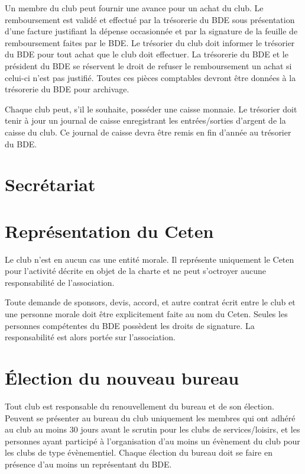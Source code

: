 \documentclass{article}
\begin{document}
\begin{multicols}{2}
{			Un membre du club peut fournir une avance pour un achat du club. Le
			remboursement est validé et effectué par la trésorerie du BDE sous
			présentation d’une facture justifiant la dépense occasionnée et par
			la signature de la feuille de remboursement faites par le BDE\@. Le
			trésorier du club doit informer le trésorier du BDE pour tout achat
			que le club doit effectuer. La trésorerie du BDE et le président du
			BDE se réservent le droit de refuser le remboursement un achat si
			celui-ci n’est pas justifié. Toutes ces pièces comptables devront
			être données à la trésorerie du BDE pour archivage.

			Chaque club peut, s’il le souhaite, posséder une caisse
			monnaie. Le trésorier doit tenir à jour un journal de caisse
			enregistrant les entrées/sorties d’argent de la caisse du
			club. Ce journal de caisse devra être remis en fin d’année au
			trésorier du BDE\@.

		}

		\section{Secrétariat}
\label{sec:secretariat}

		\section{Représentation du Ceten}
\label{sec:representation_du_ceten}

		{\small

			Le club n’est en aucun cas une entité morale. Il représente
			uniquement le Ceten pour l’activité décrite en objet de la charte et
			ne peut s’octroyer aucune responsabilité de l’association.

			Toute demande de sponsors, devis, accord, et autre contrat
			écrit entre le club et une personne morale doit être
			explicitement faite au nom du Ceten. Seules les personnes
			compétentes du BDE possèdent les droits de signature. La
			responsabilité est alors portée sur l’association.

		}

		\section{Élection du nouveau bureau}
\label{sec:election_du_nouveau_bureau}

		{\small

			Tout club est responsable du renouvellement du bureau et
			de son élection. Peuvent se présenter au bureau du club
			uniquement les membres qui ont adhéré au club au moins
			30 jours avant le scrutin pour les clubs de services/loisirs, et
			les personnes ayant participé à l’organisation d’au moins un
			évènement du club pour les clubs de type évènementiel.
			Chaque élection du bureau doit se faire en présence d’au
			moins un représentant du BDE\@.

}
\end{multicols}
\end{document}

